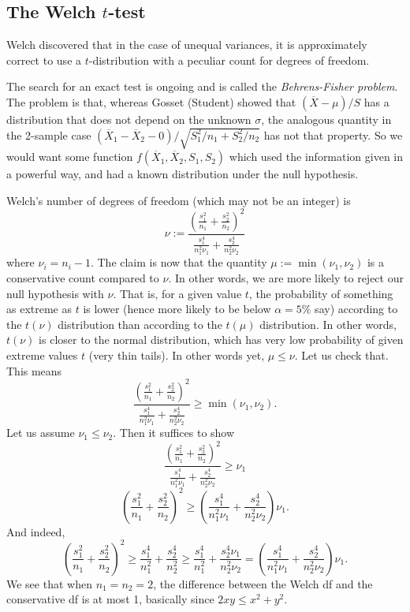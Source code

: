 {%
\subsection{The Welch $t$-test}
Welch discovered that in the case of unequal variances, it is approximately correct to use a $t$-distribution with a peculiar count for degrees of freedom.

The search for an exact test is ongoing and is called the \emph{Behrens-Fisher problem}. The problem is that, whereas Gosset (Student) showed that $(\overline X-\mu)/S$ has a distribution that does not depend on the unknown $\sigma$, the analogous quantity in the 2-sample case $(\overline X_1-\overline X_2-0)/\sqrt{S^2_1/n_1+S^2_2/n_2}$ has not that property. So we would want some function $f(\overline X_1,\overline X_2,S_1,S_2)$ which used the information given in a powerful way, and had a known distribution under the null hypothesis.

Welch's number of degrees of freedom (which may not be an integer) is
\[
	\nu :=
	\frac{
		\left(
			 \frac{s_1^2}{n_1}
			+\frac{s_2^2}{n_2}
		\right)^2
	}{
			 \frac{s_1^4}{n_1^2\nu_1}
			+\frac{s_2^4}{n_2^2\nu_2}
	}
\]
where $\nu_i=n_i-1$. The claim is now that the quantity $\mu:=\min(\nu_1,\nu_2)$ is a conservative count compared to $\nu$. In other words, we are more likely to reject our null hypothesis with $\nu$. That is, for a given value $t$, the probability of something as extreme as $t$ is lower (hence more likely to be below $\alpha=5\%$ say) according to the $t(\nu)$ distribution than according to the $t(\mu)$ distribution. In other words, $t(\nu)$ is closer to the normal distribution, which has very low probability of given extreme values $t$ (very thin tails). In other words yet, $\mu\le\nu$. Let us check that. This means
\[
	\frac{\left(
			\frac{s_1^2}{n_1}+\frac{s_2^2}{n_2}
		\right)^2}{
			\frac{s_1^4}{n_1^2\nu_1}+\frac{s_2^4}{n_2^2\nu_2}
		}
		\ge \min(\nu_1,\nu_2).
\]
Let us assume $\nu_1\le \nu_2$. Then it suffices to show
\[
	\frac{\left(
			\frac{s_1^2}{n_1}+\frac{s_2^2}{n_2}
		\right)^2}{
			\frac{s_1^4}{n_1^2\nu_1}+\frac{s_2^4}{n_2^2\nu_2}
		}
		\ge \nu_1
\]
\[
	\left(
		\frac{s_1^2}{n_1}+\frac{s_2^2}{n_2}
	\right)^2
	\ge
		\left(\frac{s_1^4}{n_1^2\nu_1}+\frac{s_2^4}{n_2^2\nu_2}\right)
	\nu_1.
\]
And indeed,
\[
	\left(
		\frac{s_1^2}{n_1}+\frac{s_2^2}{n_2}
	\right)^2
	\ge
	\frac{s_1^4}{n_1^2}+\frac{s_2^4}{n_2^2}
	\ge
	\frac{s_1^4}{n_1^2}+\frac{s_2^4\nu_1}{n_2^2\nu_2}
	=
		\left(\frac{s_1^4}{n_1^2\nu_1}+\frac{s_2^4}{n_2^2\nu_2}\right)
	\nu_1.
\]
We see that when $n_1=n_2=2$, the difference between the Welch df and the conservative df is at most 1, basically since $2xy\le x^2+y^2$.

}
